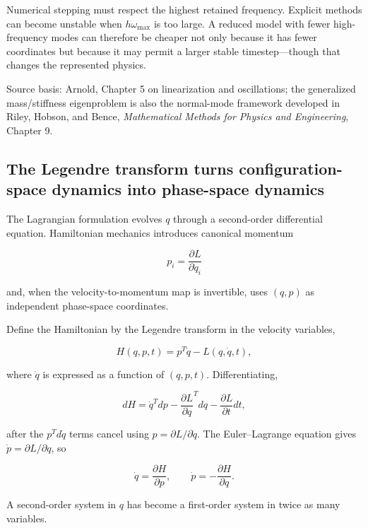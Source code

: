 Numerical stepping must respect the highest retained frequency. Explicit methods can become unstable when \(h\omega_{\max}\) is too large. A reduced model with fewer high-frequency modes can therefore be cheaper not only because it has fewer coordinates but because it may permit a larger stable timestep---though that changes the represented physics.

Source basis: Arnold, Chapter 5 on linearization and oscillations; the generalized mass/stiffness eigenproblem is also the normal-mode framework developed in Riley, Hobson, and Bence, \emph{Mathematical Methods for Physics and Engineering}, Chapter 9.

\subsection{The Legendre transform turns configuration-space dynamics into phase-space dynamics}\label{02-foundations-ii-ch039-the-legendre-transform-turns-configuration-space-dynamics-into-phase-space-dynamics}

\hypertarget{02-foundations-ii-ch039-the-legendre-transform-turns-configuration-space-dynamics-into-phase-space-dynamics}{}

The Lagrangian formulation evolves \(q\) through a second-order differential equation. Hamiltonian mechanics introduces canonical momentum

\[
p_i
=
\frac{\partial L}{\partial\dot q_i}
\]

and, when the velocity-to-momentum map is invertible, uses \((q,p)\) as independent phase-space coordinates.

Define the Hamiltonian by the Legendre transform in the velocity variables,

\[
H(q,p,t)
=
p^T\dot q-L(q,\dot q,t),
\]

where \(\dot q\) is expressed as a function of \((q,p,t)\). Differentiating,

\[
dH
=
\dot q^Tdp
-
\frac{\partial L}{\partial q}^Tdq
-
\frac{\partial L}{\partial t}dt,
\]

after the \(p^Td\dot q\) terms cancel using \(p=\partial L/\partial\dot q\). The Euler--Lagrange equation gives \(\dot p=\partial L/\partial q\), so

\[
\boxed{
\dot q=
\frac{\partial H}{\partial p},
\qquad
\dot p=
-\frac{\partial H}{\partial q}.
}
\]

A second-order system in \(q\) has become a first-order system in twice as many variables.

